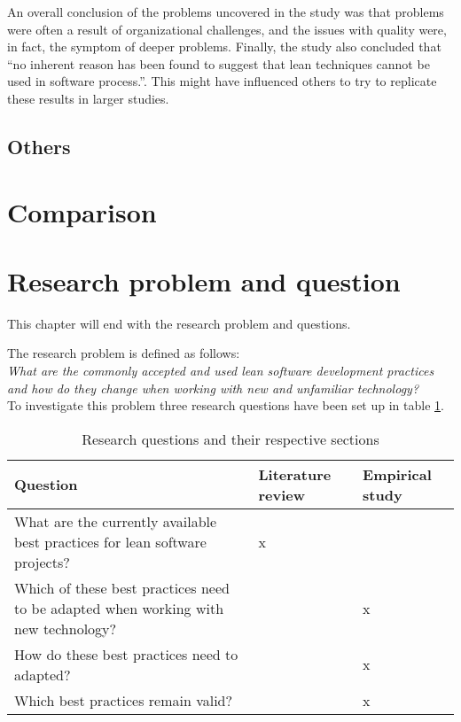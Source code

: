An overall conclusion of the problems uncovered in the study was that problems were often a result of organizational challenges, and the issues with quality were, in fact, the symptom of deeper problems. Finally, the study also concluded that ``no inherent reason has been found to suggest that lean techniques cannot be used in software process.''\cite{Middleton2001Lean}. This might have influenced others to try to replicate these results in larger studies.



\subsection{Others}
\label{othercases}


\section{Comparison}
\label{section:comparison}



\section{Research problem and question}
\label{section:problem}

This chapter will end with the research problem and questions.

The research problem is defined as follows:\\

\textit{What are the commonly accepted and used lean software development practices and how do they change when working with new and unfamiliar technology?}\\

To investigate this problem three research questions have been set up in table \ref{tbl:questions}.


\begin{table}
  \begin{tabular}{p{200pt} | p{70pt} | p{70pt}}
    Question & Literature review & Empirical study \\
    \hline
    What are the currently available best practices for lean software projects? & x & \\
    Which of these best practices need to be adapted when working with new technology? &  & x \\
    How do these best practices need to adapted? &  & x \\
    Which best practices remain valid? &  & x \\
  \end{tabular}
  \caption{Research questions and their respective sections}
  \label{tbl:questions}
\end{table}